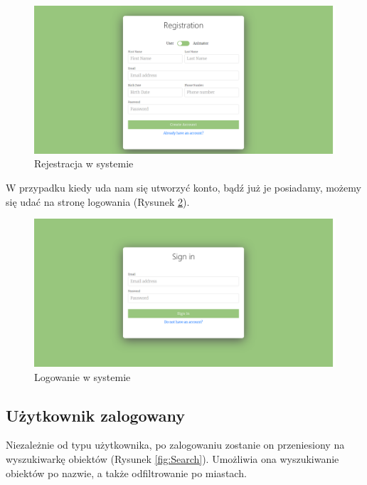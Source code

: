 \documentclass[a4paper,11pt]{article}
\begin{document}
    \begin{figure}[H] 
    	\begin{center}
    		\includegraphics[width=1\textwidth]{img3/Register.png}
            \caption{Rejestracja w systemie}
            \label{fig:Reg}
    	\end{center}
    \end{figure}
    
    W przypadku kiedy uda nam się utworzyć konto, bądź już je posiadamy, możemy się udać na stronę logowania (Rysunek \ref{fig:Log}).
    
    \begin{figure}[H] 
    	\begin{center}
    		\includegraphics[width=1\textwidth]{img3/Login.png}
            \caption{Logowanie w systemie}
            \label{fig:Log}
    	\end{center}
    \end{figure}
    
    \subsection{Użytkownik zalogowany}
    
    Niezależnie od typu użytkownika, po zalogowaniu zostanie on przeniesiony na wyszukiwarkę obiektów (Rysunek \ref{fig:Search}). Umożliwia ona wyszukiwanie obiektów po nazwie, a także odfiltrowanie po miastach.
    
\end{document}
